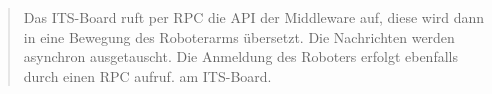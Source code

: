 \begin{quote}
	Das ITS-Board ruft per RPC die API der Middleware auf, diese wird dann in eine Bewegung des Roboterarms übersetzt. Die Nachrichten werden asynchron ausgetauscht. Die Anmeldung des Roboters erfolgt ebenfalls durch einen RPC aufruf. am ITS-Board.
	
\end{quote}